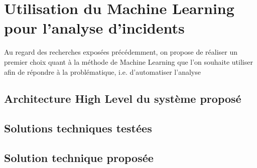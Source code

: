 \chapter{Utilisation du Machine Learning pour l'analyse d'incidents}
\label{Utilisation du Machine Learning pour l'analyse d'incidents}
\thispagestyle{fancy}

Au regard des recherches exposées précédemment, on propose de réaliser un premier choix quant à la méthode de Machine Learning que l'on souhaite utiliser afin de répondre à la problématique, i.e. d'automatiser l'analyse 

\section{Architecture High Level du système proposé}
\label{Utilisation du Machine Learning pour l'analyse d'incidents: Achitecture High Level du système proposé}

\section{Solutions techniques testées}
\label{Utilisation du Machine Learning pour l'analyse d'incidents: Solutions techniques testées}

\section{Solution technique proposée}
\label{Utilisation du Machine Learning pour l'analyse d'incidents: Solution technique proposée}

